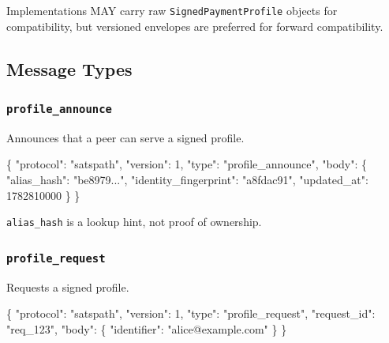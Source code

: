 \documentclass[
]{article}
\newenvironment{Shaded}{}{}
\newcommand{\DataTypeTok}[1]{\textcolor[rgb]{0.56,0.13,0.00}{#1}}
\newcommand{\DecValTok}[1]{\textcolor[rgb]{0.25,0.63,0.44}{#1}}
\newcommand{\FunctionTok}[1]{\textcolor[rgb]{0.02,0.16,0.49}{#1}}
\newcommand{\StringTok}[1]{\textcolor[rgb]{0.25,0.44,0.63}{#1}}
\begin{document}
Implementations MAY carry raw \texttt{SignedPaymentProfile} objects for
compatibility, but versioned envelopes are preferred for forward
compatibility.

\hypertarget{message-types}{%
\subsection{Message Types}\label{message-types}}

\hypertarget{profile_announce}{%
\subsubsection{\texorpdfstring{\texttt{profile\_announce}}{profile\_announce}}\label{profile_announce}}

Announces that a peer can serve a signed profile.

\begin{Shaded}
\begin{Highlighting}[]
\FunctionTok{\{}
  \DataTypeTok{"protocol"}\FunctionTok{:} \StringTok{"satspath"}\FunctionTok{,}
  \DataTypeTok{"version"}\FunctionTok{:} \DecValTok{1}\FunctionTok{,}
  \DataTypeTok{"type"}\FunctionTok{:} \StringTok{"profile\_announce"}\FunctionTok{,}
  \DataTypeTok{"body"}\FunctionTok{:} \FunctionTok{\{}
    \DataTypeTok{"alias\_hash"}\FunctionTok{:} \StringTok{"be8979..."}\FunctionTok{,}
    \DataTypeTok{"identity\_fingerprint"}\FunctionTok{:} \StringTok{"a8fdac91"}\FunctionTok{,}
    \DataTypeTok{"updated\_at"}\FunctionTok{:} \DecValTok{1782810000}
  \FunctionTok{\}}
\FunctionTok{\}}
\end{Highlighting}
\end{Shaded}

\texttt{alias\_hash} is a lookup hint, not proof of ownership.

\hypertarget{profile_request}{%
\subsubsection{\texorpdfstring{\texttt{profile\_request}}{profile\_request}}\label{profile_request}}

Requests a signed profile.

\begin{Shaded}
\begin{Highlighting}[]
\FunctionTok{\{}
  \DataTypeTok{"protocol"}\FunctionTok{:} \StringTok{"satspath"}\FunctionTok{,}
  \DataTypeTok{"version"}\FunctionTok{:} \DecValTok{1}\FunctionTok{,}
  \DataTypeTok{"type"}\FunctionTok{:} \StringTok{"profile\_request"}\FunctionTok{,}
  \DataTypeTok{"request\_id"}\FunctionTok{:} \StringTok{"req\_123"}\FunctionTok{,}
  \DataTypeTok{"body"}\FunctionTok{:} \FunctionTok{\{}
    \DataTypeTok{"identifier"}\FunctionTok{:} \StringTok{"alice@example.com"}
  \FunctionTok{\}}
\FunctionTok{\}}
\end{Highlighting}
\end{Shaded}
\end{document}
